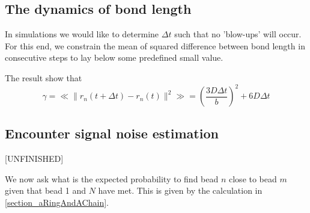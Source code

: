 \documentclass{report}
\begin{document}
\subsection{The dynamics of bond length}\label{subsection_theDynamicsOfBondLength}
In simulations we would like to determine $\Delta t$ such that no 'blow-ups' will occur. For this end, we constrain the mean of squared difference between bond length in consecutive steps to lay below some predefined small value. 

The result show that 
\begin{equation*}
\gamma=\ll\|r_n(t+\Delta t)-r_n(t) \|^2\gg = \left(\frac{3D\Delta t}{b} \right)^2+6D\Delta t
\end{equation*}

\subsection{Encounter signal noise estimation}\label{subsection_encounterSignalnoiseEstimation}
[UNFINISHED]

We now ask what is the expected probability to find bead $n$ close to bead $m$ given that bead 1 and $N$ have met. This is given by the calculation in \ref{section_aRingAndAChain}. 


\end{document}
